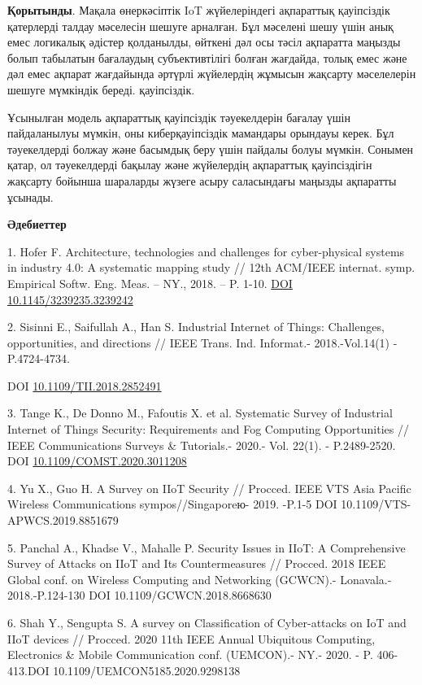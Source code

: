 \documentclass[
]{article}
\begin{document}
\textbf{Қорытынды}. Мақала өнеркәсіптік IoT жүйелеріндегі ақпараттық
қауіпсіздік қатерлерді талдау мәселесін шешуге арналған. Бұл мәселені
шешу үшін анық емес логикалық әдістер қолданылды, өйткені дәл осы тәсіл
ақпаратта маңызды болып табылатын бағалаудың субъективтілігі болған
жағдайда, толық емес және дәл емес ақпарат жағдайында әртүрлі жүйелердің
жұмысын жақсарту мәселелерін шешуге мүмкіндік береді. қауіпсіздік.

Ұсынылған модель ақпараттық қауіпсіздік тәуекелдерін бағалау үшін
пайдаланылуы мүмкін, оны киберқауіпсіздік мамандары орындауы керек. Бұл
тәуекелдерді болжау және басымдық беру үшін пайдалы болуы мүмкін.
Сонымен қатар, ол тәуекелдерді бақылау және жүйелердің ақпараттық
қауіпсіздігін жақсарту бойынша шараларды жүзеге асыру саласындағы
маңызды ақпаратты ұсынады.

\textbf{Әдебиеттер}

1. Hofer F. Architecture, technologies and challenges for cyber-physical
systems in industry 4.0: A systematic mapping study // 12th ACM/IEEE
internat. symp. Empirical Softw. Eng. Meas. -- NY., 2018. -- P. 1-10.
\href{https://doi.org/10.1145/3239235.3239242}{DOI
10.1145/3239235.3239242}

2. Sisinni E., Saifullah A., Han S. Industrial Internet of Things:
Challenges, opportunities, and directions // IEEE Trans. Ind. Informat.-
2018.-Vol.14(1) - P.4724-4734.

DOI
\href{https://doi.org/10.1109/TII.2018.2852491}{10.1109/TII.2018.2852491}

3. Tange K., De Donno M., Fafoutis X. et al. Systematic Survey of
Industrial Internet of Things Security: Requirements and Fog Computing
Opportunities // IEEE Communications Surveys \& Tutorials.- 2020.- Vol.
22(1). - P.2489-2520. DOI
\href{http://dx.doi.org/10.1109/COMST.2020.3011208}{10.1109/COMST.2020.3011208}

4. Yu X., Guo H. A Survey on IIoT Security // Procced. IEEE VTS Asia
Pacific Wireless Communications sympos//Singaporeю- 2019. -P.1-5 DOI
10.1109/VTS-APWCS.2019.8851679

5. Panchal A., Khadse V., Mahalle P. Security Issues in IIoT: A
Comprehensive Survey of Attacks on IIoT and Its Countermeasures //
Procced. 2018 IEEE Global conf. on Wireless Computing and Networking
(GCWCN).- Lonavala.- 2018.-P.124-130 DOI 10.1109/GCWCN.2018.8668630

6. Shah Y., Sengupta S. A survey on Classification of Cyber-attacks on
IoT and IIoT devices // Procced. 2020 11th IEEE Annual Ubiquitous
Computing, Electronics \& Mobile Communication conf. (UEMCON).- NY.-
2020. - P. 406-413.DOI 10.1109/UEMCON5185.2020.9298138
\end{document}
